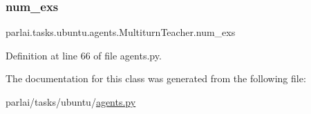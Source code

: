 \subsubsection{\texorpdfstring{num\+\_\+exs}{num\_exs}}
{\footnotesize\ttfamily parlai.\+tasks.\+ubuntu.\+agents.\+Multiturn\+Teacher.\+num\+\_\+exs}



Definition at line 66 of file agents.\+py.



The documentation for this class was generated from the following file\+:\begin{DoxyCompactItemize}
\item 
parlai/tasks/ubuntu/\hyperlink{parlai_2tasks_2ubuntu_2agents_8py}{agents.\+py}\end{DoxyCompactItemize}
